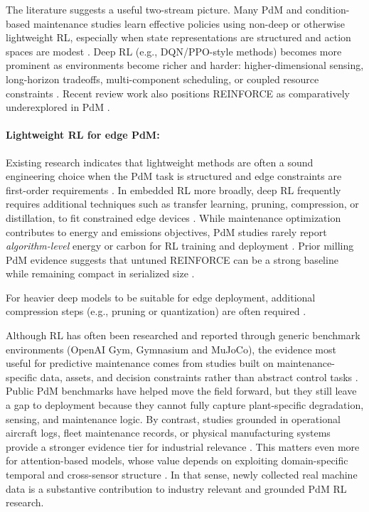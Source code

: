 \documentclass[sn-vancouver-num]{sn-jnl}%
\begin{document}
The literature suggests a useful two-stream picture. Many PdM and condition-based maintenance studies learn effective policies using non-deep or otherwise lightweight RL, especially when state representations are structured and action spaces are modest \cite{Adsule2020, Yousefi2020, Rasay2024, Dadash2024}. Deep RL (e.g., DQN/PPO-style methods) becomes more prominent as environments become richer and harder: higher-dimensional sensing, long-horizon tradeoffs, multi-component scheduling, or coupled resource constraints \cite{Liu2020, Chen2023, Lee2022, Ong2022-02}. Recent review work also positions \textsc{REINFORCE} as comparatively underexplored in PdM \cite{Siraskar2025}.

\paragraph{Lightweight RL for edge PdM:}
Existing research indicates that lightweight methods are often a sound engineering choice when the PdM task is structured and edge constraints are first-order requirements \cite{Compare2020, Njor2024, Pandey2023}. In embedded RL more broadly, deep RL frequently requires additional techniques such as transfer learning, pruning, compression, or distillation, to fit constrained edge devices \cite{Jang2020, Szydlo2022, Xu2022}.
While maintenance optimization contributes to energy and emissions objectives, PdM studies rarely report \emph{algorithm-level} energy or carbon for RL training and deployment \cite{Banyai2021, Banyai2022, JasiulewiczKaczmarek2024}. Prior milling PdM evidence suggests that untuned \textsc{REINFORCE} can be a strong baseline while remaining compact in serialized size \cite{Siraskar2025}.

For heavier deep models to be suitable for edge deployment, additional compression steps (e.g., pruning or quantization) are often required \cite{Pandey2023, Jang2020, Xu2022}.

Although RL has often been researched and reported through generic benchmark environments (OpenAI Gym, Gymnasium and MuJoCo), the evidence most useful for predictive maintenance comes from studies built on maintenance-specific data, assets, and decision constraints rather than abstract control tasks \cite{Andrade2021Aircraft,Dangut2022RareFailure,Zhao2024,Siraskar2025}. Public PdM benchmarks have helped move the field forward, but they still leave a gap to deployment because they cannot fully capture plant-specific degradation, sensing, and maintenance logic. By contrast, studies grounded in operational aircraft logs, fleet maintenance records, or physical manufacturing systems provide a stronger evidence tier for industrial relevance \cite{Andrade2021Aircraft,Dangut2022RareFailure,Chen2024DigitalTwin}. This matters even more for attention-based models, whose value depends on exploiting domain-specific temporal and cross-sensor structure \cite{Zhao2024}. In that sense, newly collected real machine data is a substantive contribution to industry relevant and grounded PdM RL research.
\end{document}
